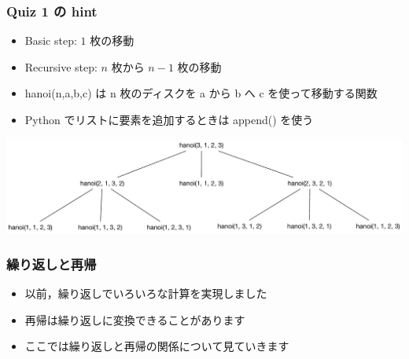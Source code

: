 \begin{frame}
\frametitle{Quiz 1 の hint}
  \begin{itemize}
\item Basic step: $1$ 枚の移動
\item Recursive step: $n$ 枚から \(n-1\) 枚の移動
\item hanoi(n,a,b,c) は n 枚のディスクを a から b へ c を使って移動する関数
\item Python でリストに要素を追加するときは append() を使う
  \end{itemize}
  \begin{center}
\includegraphics[scale=0.28]{./Figure/elementaryCS-figHanoi-Hint.pdf}
  \end{center}
\end{frame}
\begin{frame}
\frametitle{繰り返しと再帰}
  \begin{itemize}
\item 以前，繰り返しでいろいろな計算を実現しました
\item 再帰は繰り返しに変換できることがあります
\item ここでは繰り返しと再帰の関係について見ていきます
  \end{itemize}
\end{frame}
